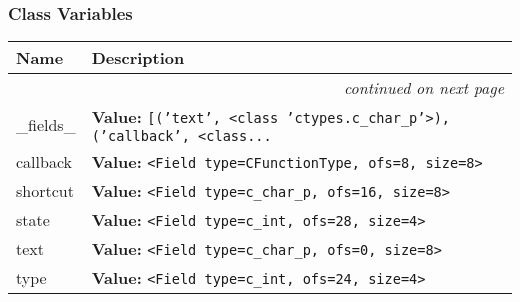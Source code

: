 
  \subsubsection{Class Variables}

    \vspace{-1cm}
\hspace{\varindent}\begin{longtable}{|p{\varnamewidth}|p{\vardescrwidth}|l}
\cline{1-2}
\cline{1-2} \centering \textbf{Name} & \centering \textbf{Description}& \\
\cline{1-2}
\endhead\cline{1-2}\multicolumn{3}{r}{\small\textit{continued on next page}}\\\endfoot\cline{1-2}
\endlastfoot\raggedright \_\-f\-i\-e\-l\-d\-s\-\_\- & \raggedright \textbf{Value:} 
{\tt \texttt{[}\texttt{(}\texttt{'}\texttt{text}\texttt{'}\texttt{, }{\textless}class 'ctypes.c\_char\_p'{\textgreater}\texttt{)}\texttt{, }\texttt{(}\texttt{'}\texttt{callback}\texttt{'}\texttt{, }{\textless}class\texttt{...}}&\\
\cline{1-2}
\raggedright c\-a\-l\-l\-b\-a\-c\-k\- & \raggedright \textbf{Value:} 
{\tt {\textless}Field type=CFunctionType, ofs=8, size=8{\textgreater}}&\\
\cline{1-2}
\raggedright s\-h\-o\-r\-t\-c\-u\-t\- & \raggedright \textbf{Value:} 
{\tt {\textless}Field type=c\_char\_p, ofs=16, size=8{\textgreater}}&\\
\cline{1-2}
\raggedright s\-t\-a\-t\-e\- & \raggedright \textbf{Value:} 
{\tt {\textless}Field type=c\_int, ofs=28, size=4{\textgreater}}&\\
\cline{1-2}
\raggedright t\-e\-x\-t\- & \raggedright \textbf{Value:} 
{\tt {\textless}Field type=c\_char\_p, ofs=0, size=8{\textgreater}}&\\
\cline{1-2}
\raggedright t\-y\-p\-e\- & \raggedright \textbf{Value:} 
{\tt {\textless}Field type=c\_int, ofs=24, size=4{\textgreater}}&\\
\cline{1-2}
\end{longtable}




